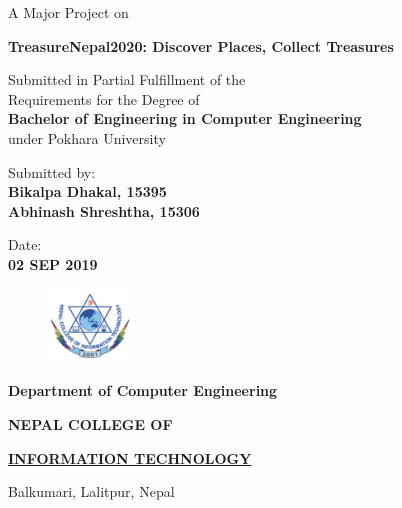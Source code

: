 \documentclass[12pt, a4paper]{report}
\begin{document}
\begin{titlepage}
	\begin{center}
	
	\large%
	A Major Project on
	
	\huge %
	\textbf{TreasureNepal2020: Discover Places, Collect Treasures}

	\vfill
	
	\large %
	Submitted in Partial Fulfillment of the \\ 
	Requirements for the Degree of \\ 
	\textbf {Bachelor of Engineering in Computer Engineering} \\
	under Pokhara University
	
	\vfill
	
	Submitted by: \\ 
	\textbf {Bikalpa Dhakal, 15395} \\
	\textbf {Abhinash Shreshtha, 15306} \\
	
	\vfill
	
	
	
	Date: \\
	\textbf {02 SEP 2019}
	
	\vfill
	
	\end{center}
	
	\begin{figure}
	\centering
	\includegraphics[width=0.2\textwidth]{college-logo}
	\end{figure}
	
	\selectfont
	
	\textbf {Department of Computer Engineering}  
	
	\Large %
	\textbf {NEPAL COLLEGE OF} 
	
	\LARGE %
	\textbf {\underline {INFORMATION TECHNOLOGY} }
	
	\small %
	Balkumari, Lalitpur, Nepal
	
	
\end{titlepage}
\end{document}
